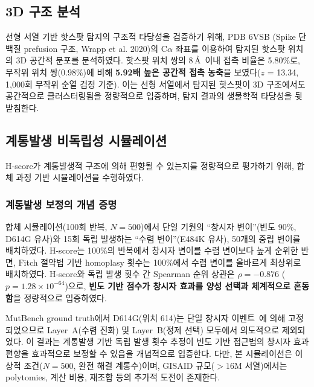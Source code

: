 \subsection{3D 구조 분석}
\label{sec:structure_analysis}


선형 서열 기반 핫스팟 탐지의 구조적 타당성을 검증하기 위해, PDB 6VSB (Spike 단백질 prefusion 구조, Wrapp et al. 2020)의 C$\alpha$ 좌표를 이용하여 탐지된 핫스팟 위치의 3D 공간적 분포를 분석하였다.
핫스팟 위치 쌍의 8\,\AA\ 이내 접촉 비율은 5.80\%로, 무작위 위치 쌍(0.98\%)에 비해 \textbf{5.92배 높은 공간적 접촉 농축}을 보였다($z$ = 13.34, 1,000회 무작위 순열 검정 기준).
이는 선형 서열에서 탐지된 핫스팟이 3D 구조에서도 공간적으로 클러스터링됨을 정량적으로 입증하며, 탐지 결과의 생물학적 타당성을 뒷받침한다.


\subsection{계통발생 비독립성 시뮬레이션}
\label{sec:phylo_simulation}


H-score가 계통발생적 구조에 의해 편향될 수 있는지를 정량적으로 평가하기 위해, 합체 과정 기반 시뮬레이션을 수행하였다.

\subsubsection{계통발생 보정의 개념 증명}
\label{subsec:phylo_correction_poc}

합체 시뮬레이션(100회 반복, $N = 500$)에서 단일 기원의 ``창시자 변이''(빈도 90\%, D614G 유사)와 15회 독립 발생하는 ``수렴 변이''(E484K 유사), 50개의 중립 변이를 배치하였다.
H-score는 100\%의 반복에서 창시자 변이를 수렴 변이보다 높게 순위한 반면, Fitch 절약법 기반 homoplasy 횟수는 100\%에서 수렴 변이를 올바르게 최상위로 배치하였다.
H-score와 독립 발생 횟수 간 Spearman 순위 상관은 $\rho = -0.876$ ($p = 1.28 \times 10^{-64}$)으로, \textbf{빈도 기반 점수가 창시자 효과를 양성 선택과 체계적으로 혼동함}을 정량적으로 입증하였다.

MutBench ground truth에서 D614G(위치 614)는 단일 창시자 이벤트~\cite{korber2020tracking}에 의해 고정되었으므로 Layer~A(수렴 진화) 및 Layer~B(정제 선택) 모두에서 의도적으로 제외되었다.
이 결과는 계통발생 기반 독립 발생 횟수 추정이 빈도 기반 접근법의 창시자 효과 편향을 효과적으로 보정할 수 있음을 개념적으로 입증한다.
다만, 본 시뮬레이션은 이상적 조건($N = 500$, 완전 해결 계통수)이며, GISAID 규모($> 16$M 서열)에서는 polytomies, 계산 비용, 재조합 등의 추가적 도전이 존재한다.

